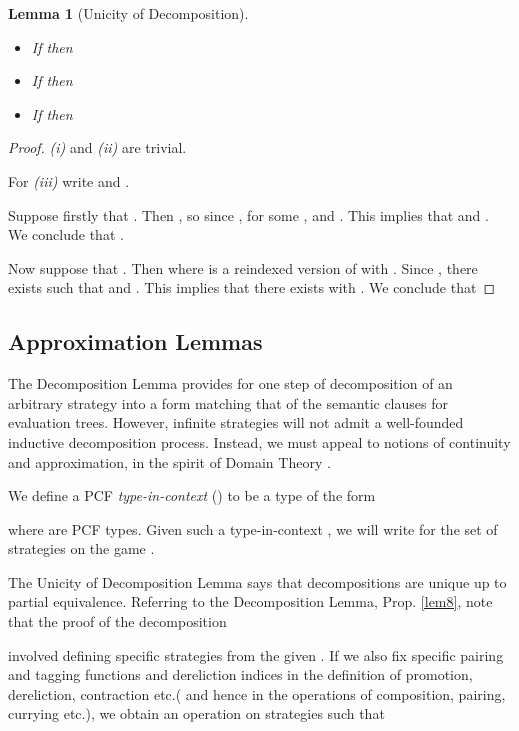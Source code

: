 \documentclass[11pt]{article}
\newtheorem{lemma}[theorem]{Lemma}
\begin{document}
\begin{lemma}[Unicity of Decomposition]\label{lem9}
\begin{itemize}
\item[(i)] If  then
  
\item[(ii)] If  then
  
\item[(iii)] If
 then

\end{itemize}
\end{lemma}
\begin{proof} {\it (i)} and {\it (ii)} are trivial.

For {\it (iii)} write  and
.

Suppose firstly that . Then , so
since , for some ,  and
. This implies that  and
. We conclude that .

Now suppose that . Then  where
 is a reindexed version of  with . Since
, there exists  such that 
and . This implies that there exists
 with . We conclude that

\end{proof}

\subsection{Approximation Lemmas}
The Decomposition Lemma provides for one step of decomposition of an
arbitrary strategy into a form matching that of the semantic clauses
for evaluation trees. However, infinite strategies will not admit a
well-founded inductive decomposition process. Instead, we must appeal
to notions of continuity and approximation, in the spirit of Domain
Theory \cite{AbramskyS:domt}.

We define a PCF {\em type-in-context} (\cite{CroleRL:catt}) to be a type of
the form

where  are PCF types. Given such a type-in-context
, we will write  for the set of strategies on the game
.

The Unicity of Decomposition Lemma says that decompositions are unique up
to partial equivalence. Referring to the Decomposition Lemma,
Prop. \ref{lem8}, note that the proof of the decomposition

involved defining specific strategies
 from the given
. If we also fix specific pairing and tagging functions and
dereliction indices in the definition of promotion,
dereliction, contraction etc.( and hence in the 
operations of composition, pairing, currying etc.), we obtain an
operation  on strategies such that
\end{document}
